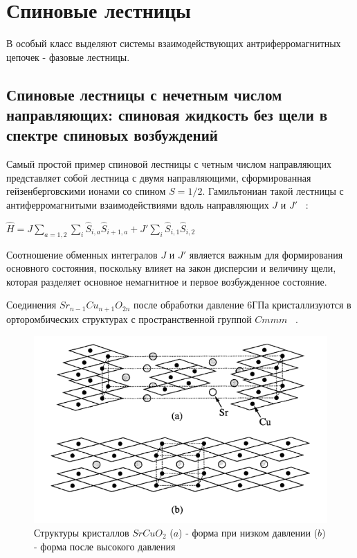 \documentclass[11pt]{article}
\begin{document}
\section{Спиновые лестницы}
В особый класс выделяют системы взаимодействующих антриферромагнитных цепочек - фазовые лестницы.

\subsection{Спиновые лестницы с нечетным числом направляющих: спиновая жидкость без щели в спектре спиновых возбуждений}
Самый простой пример спиновой лестницы с четным числом направляющих представляет собой лестница с двумя направляющими, сформированная гейзенберговскими ионами со спином $S=1/2$. Гамильтониан такой лестницы с антиферромагнитыми взаимодействиями вдоль направляющих $J$ и $J'$ ~\cite{barnes1993}:

$\hat H = J \sum\limits_{a=1,2}\sum\limits_i \hat S_{i,a} \hat S_{i+1, a} + J' \sum\limits_i \hat S_{i,1} \hat S_{i,2}$

Соотношение обменных интегралов $J$ и $J'$ является важным для формирования основного состояния, поскольку влияет на закон дисперсии и величину щели, которая разделяет основное немагнитное и первое возбужденное состояние.

Соединения $Sr_{n-1}Cu_{n+1}O_{2n}$ после обработки давление 6ГПа кристаллизуются в орторомбических структурах с пространственной группой $ Cmmm $ ~\cite{hiroi1991}.

\begin{figure}[htp]
\centering
\includegraphics[scale=0.5]{SrCuO2}
\caption{Структуры кристаллов $SrCuO_2$ ($a$) - форма при низком давлении ($b$) - форма после высокого давления ~\cite{hiroi1991}}
\label{}
\end{figure}
\end{document}
